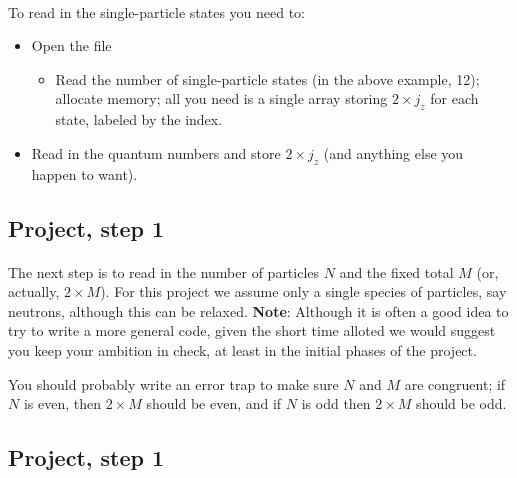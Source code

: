 \documentclass[%
twoside,                 %
final,                   %
10pt]{article}
\begin{document}
\paragraph{}
To read in the single-particle states you need to:
\begin{itemize}
\item Open the file 
\begin{itemize}

 \item Read the number of single-particle states (in the above example, 12);  allocate memory; all you need is a single array storing $2\times j_z$ for each state, labeled by the index.

\end{itemize}

\noindent
\item Read in the quantum numbers and store $2 \times j_z$ (and anything else you happen to want).
\end{itemize}

\noindent



\subsection{Project, step 1}

\paragraph{}

The next step is to read in the number of particles $N$ and the fixed total $M$ (or, actually, $2 \times M$). 
For this project we assume only a single species of particles, say neutrons, although this can be 
relaxed. \textbf{Note}: Although it is often a good idea to try to write a more general code, given the 
short time alloted we would suggest you keep your ambition in check, at least in the initial phases of the 
project.  


You should probably write an error trap to make sure $N$ and $M$ are congruent; if $N$ is even, then 
$2 \times M$ should be even, and if $N$ is odd then $2\times M$ should be odd.



\subsection{Project, step 1}
\end{document}
